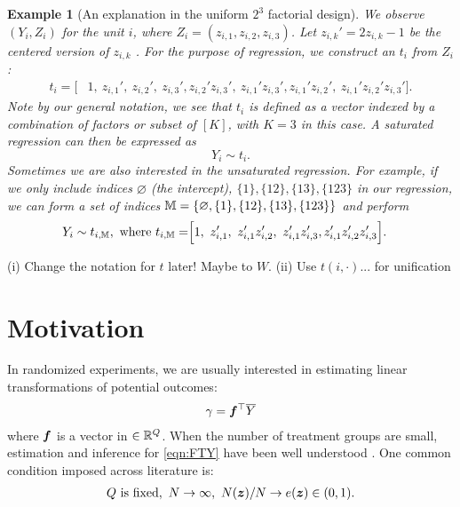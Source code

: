 \documentclass[12pt]{article}
\newtheorem{example}{Example}
\begin{document}
\begin{example}[An explanation in the uniform $2^3$ factorial design]
We observe $(Y_i, {Z}_i)$ for the unit $i$, where ${Z}_i = (z_{i,1},z_{i,2},z_{i,3})$. Let $z_{i,k}' = 2z_{i,k} - 1$ be the centered version of $z_{i,k} $ .  For the purpose of regression, we construct an ${t}_i$ from ${Z}_i$:
\begin{align*}
{t}_i = \Big[&1, ~z_{i,1}', ~z_{i,2}', ~z_{i,3}',
z_{i,2}'z_{i,3}', ~z_{i,1}'z_{i,3}',  z_{i,1}'z_{i,2}', ~ z_{i,1}'z_{i,2}'z_{i,3}'\Big].
\end{align*}
Note by our general notation, we see that ${t}_i$ is defined as a vector indexed by a combination of factors or subset of $[K]$, with $K=3$ in this case. A saturated regression can then be expressed as 
\[
Y_i \sim {t}_i.
\]
Sometimes we are also interested in the unsaturated regression. For example, if we only include indices $\varnothing$ (the intercept), $\{1\},\{12\},\{13\},\{123\}$ in our regression, we can form a set of indices ${\mathbb{M}}=\{\varnothing, \{1\},\{12\},\{13\},\{123\}\}$ and perform
\begin{align*}
Y_i\sim {t}_{i,{\mathbb{M}}}, \text{ where } {t}_{i,{\mathbb{M}}} = &\Big[1, ~z_{i,1}', ~z_{i,1}'z_{i,2}', ~z_{i,1}'z_{i,3}', z_{i,1}'z_{i,2}'z_{i,3}'\Big].
\end{align*}
\end{example}

{\color{red} (i) Change the notation for $t$ later! Maybe to $W$.  (ii) Use $t(i, \cdot)$... for unification}


\section{Motivation}

In randomized experiments, we are usually interested in estimating linear transformations of potential outcomes:
\begin{align}\label{eqn:FTY}
    \gamma = {\boldsymbol{f}}^\top \overline{Y}
\end{align}
where ${\boldsymbol{f}}$ is a vector in $\in{\mathbb{R}}^{Q}$. When the number of treatment groups are small, estimation and inference for \eqref{eqn:FTY} have been well understood \citep{li2017general, zhao2021regression, zhao2021covariate}. One common condition imposed across literature is:
\begin{align}\label{eqn:old-cond}
    Q \text{ is fixed}, ~ N\to\infty, ~N({\boldsymbol{z}})/N \to e({{\boldsymbol{z}}}) \in (0,1).
\end{align}
\end{document}
